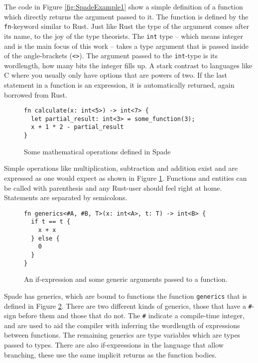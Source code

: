 The code in Figure \ref{fig:SpadeExample1} show a simple definition of a function which directly returns the argument passed to it. The function is defined by the \verb+fn+-keyword similar to Rust. Just like Rust the type of the argument comes after its name, to the joy of the type theorists. The \verb+int+ type -- which means integer and is the main focus of this work -- takes a type argument that is passed inside of the angle-brackets (\verb+<>+). The argument passed to the \verb+int+-type is its wordlength, how many bits the integer fills up. A stark contrast to languages like C where you usually only have options that are powers of two. If the last statement in a function is an expression, it is automatically returned, again borrowed from Rust.

\begin{figure}[h!]
\begin{verbatim}
fn calculate(x: int<5>) -> int<7> {
  let partial_result: int<3> = some_function(3);
  x + 1 * 2 - partial_result
}
\end{verbatim}
  \caption{Some mathematical operations defined in Spade}
  \label{fig:SpadeExampleOps}
\end{figure}

Simple operations like multiplication, subtraction and addition exist and are expressed as one would expect as shown in Figure \ref{fig:SpadeExampleOps}. Functions and entities can be called with parenthesis and any Rust-user should feel right at home. Statements are separated by semicolons.

\begin{figure}[h!]
\begin{verbatim}
fn generics<#A, #B, T>(x: int<A>, t: T) -> int<B> {
  if t == t {
    x + x
  } else {
    0
  }
}
\end{verbatim}
  \caption{An if-expression and some generic arguments passed to a function.}
  \label{fig:SpadeExample2}
\end{figure}

Spade has generics, which are bound to functions the function \verb+generics+ that is defined in Figure \ref{fig:SpadeExample2}. There are two different kinds of generics, those that have a \verb+#+-sign before them and those that do not. The \verb+#+ indicate a compile-time integer, and are used to aid the compiler with inferring the wordlength of expressions between functions. The remaining generics are type variables which are types passed to types. There are also if-expressions in the language that allow branching, these use the same implicit returns as the function bodies.

